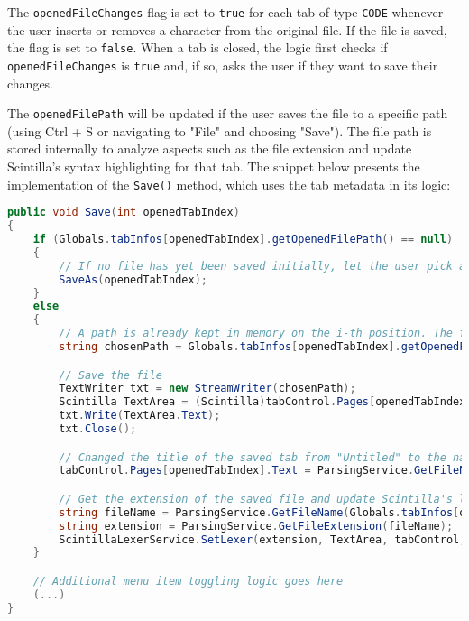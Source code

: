 The \texttt{openedFileChanges} flag is set to \texttt{true} for each tab of type \texttt{CODE} whenever the user inserts or removes a character from the original file. If the file is saved, the flag is set to \texttt{false}. When a tab is closed, the logic first checks if \texttt{openedFileChanges} is \texttt{true} and, if so, asks the user if they want to save their changes.

The \texttt{openedFilePath} will be updated if the user saves the file to a specific path (using Ctrl + S or navigating to "File" and choosing "Save"). The file path is stored internally to analyze aspects such as the file extension and update Scintilla's syntax highlighting for that tab. The snippet below presents the implementation of the \texttt{Save()} method, which uses the tab metadata in its logic:

\begin{lstlisting}[language=csharp, caption={Pie's implementation of the Save() method that gets called whenever the user wants to save a file inside a CODE tab}]
public void Save(int openedTabIndex)
{
    if (Globals.tabInfos[openedTabIndex].getOpenedFilePath() == null)
    {
        // If no file has yet been saved initially, let the user pick a path for their file. SaveAs() opens a SaveFileDialog before updating tab metadata and then writes to the output file
        SaveAs(openedTabIndex);
    }
    else
    {
        // A path is already kept in memory on the i-th position. The file should be saved in the same place
        string chosenPath = Globals.tabInfos[openedTabIndex].getOpenedFilePath();

        // Save the file
        TextWriter txt = new StreamWriter(chosenPath);
        Scintilla TextArea = (Scintilla)tabControl.Pages[openedTabIndex].Controls[0];
        txt.Write(TextArea.Text);
        txt.Close();

        // Changed the title of the saved tab from "Untitled" to the name of the file
        tabControl.Pages[openedTabIndex].Text = ParsingService.GetFileName(chosenPath);

        // Get the extension of the saved file and update Scintilla's lexer accordingly
        string fileName = ParsingService.GetFileName(Globals.tabInfos[openedTabIndex].getOpenedFilePath());
        string extension = ParsingService.GetFileExtension(fileName);
        ScintillaLexerService.SetLexer(extension, TextArea, tabControl, openedTabIndex);
    }

    // Additional menu item toggling logic goes here
    (...)
}
\end{lstlisting}

